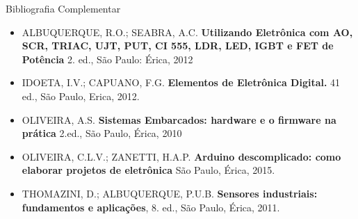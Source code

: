 \documentclass[aspectratio=169,
				xcolor=table]{beamer}
\begin{document}
	\begin{frame}[allowframebreaks]{Bibliografia Complementar}
		\begin{itemize}
			\item ALBUQUERQUE, R.O.; SEABRA, A.C. \textbf{Utilizando Eletrônica com AO, SCR, TRIAC, UJT, PUT, CI 555, LDR, LED, IGBT e FET de Potência} 2. ed., São Paulo: Érica, 2012

			\vspace{1em} 
			\item IDOETA, I.V.; CAPUANO, F.G. \textbf{Elementos de Eletrônica Digital.} 41 ed., São Paulo, Erica, 2012.
			\vspace{1em} 
			\item OLIVEIRA, A.S. \textbf{Sistemas Embarcados: hardware e o firmware na prática} 2.ed., São Paulo, Érica, 2010
			\vspace{1em} 
			\item OLIVEIRA, C.L.V.; ZANETTI, H.A.P. \textbf{Arduino descomplicado: como elaborar projetos de eletrônica} São Paulo, Érica, 2015.
			\vspace{1em} 

			\item THOMAZINI, D.; ALBUQUERQUE, P.U.B. \textbf{Sensores industriais: fundamentos e aplicações}, 8. ed., São Paulo, Érica, 2011.
		\end{itemize}
	\end{frame}
	
	\begin{frame}{}
	\end{frame}
\end{document}
